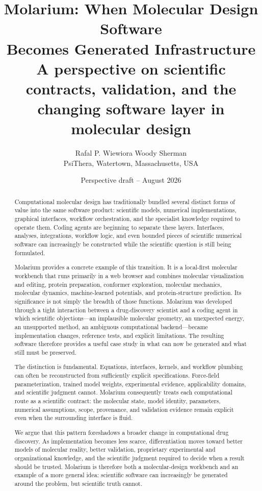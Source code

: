 \documentclass[11pt]{article}
\title{\textcolor{molblue}{\textbf{Molarium: When Molecular Design Software\\Becomes Generated Infrastructure}}\\[0.5em]
\large A perspective on scientific contracts, validation, and the changing software layer in molecular design}
\author{Rafal P. Wiewiora \qquad Woody Sherman\\
\normalsize PsiThera, Watertown, Massachusetts, USA}
\date{Perspective draft -- August 2026}
\begin{document}
\maketitle
\thispagestyle{fancy}

\begin{abstract}
Computational molecular design has traditionally bundled several distinct forms of value into the same software product: scientific models, numerical implementations, graphical interfaces, workflow orchestration, and the specialist knowledge required to operate them. Coding agents are beginning to separate these layers. Interfaces, analyses, integrations, workflow logic, and even bounded pieces of scientific numerical software can increasingly be constructed while the scientific question is still being formulated.

Molarium provides a concrete example of this transition. It is a local-first molecular workbench that runs primarily in a web browser and combines molecular visualization and editing, protein preparation, conformer exploration, molecular mechanics, molecular dynamics, machine-learned potentials, and protein-structure prediction. Its significance is not simply the breadth of those functions. Molarium was developed through a tight interaction between a drug-discovery scientist and a coding agent in which scientific objections---an implausible molecular geometry, an unexpected energy, an unsupported method, an ambiguous computational backend---became implementation changes, reference tests, and explicit limitations. The resulting software therefore provides a useful case study in what can now be generated and what still must be preserved.

The distinction is fundamental. Equations, interfaces, kernels, and workflow plumbing can often be reconstructed from sufficiently explicit specifications. Force-field parameterization, trained model weights, experimental evidence, applicability domains, and scientific judgment cannot. Molarium consequently treats each computational route as a scientific contract: the molecular state, model identity, parameters, numerical assumptions, scope, provenance, and validation evidence remain explicit even when the surrounding interface is fluid.

We argue that this pattern foreshadows a broader change in computational drug discovery. As implementation becomes less scarce, differentiation moves toward better models of molecular reality, better validation, proprietary experimental and organizational knowledge, and the scientific judgment required to decide when a result should be trusted. Molarium is therefore both a molecular-design workbench and an example of a more general idea: scientific software can increasingly be generated around the problem, but scientific truth cannot.
\end{abstract}
\end{document}
